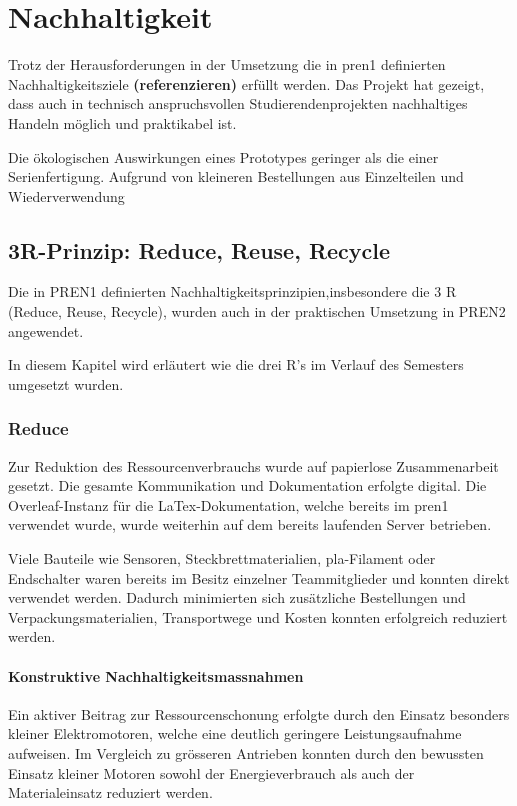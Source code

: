 \section{Nachhaltigkeit}

Trotz der Herausforderungen in der Umsetzung die in \acrshort{pren1}  definierten Nachhaltigkeitsziele \textbf{(referenzieren)} erfüllt werden. Das Projekt hat gezeigt, dass auch in technisch anspruchsvollen Studierendenprojekten nachhaltiges Handeln möglich und praktikabel ist.

Die ökologischen Auswirkungen eines Prototypes geringer als die einer Serienfertigung. Aufgrund von kleineren Bestellungen aus Einzelteilen und Wiederverwendung

\subsection{3R-Prinzip: Reduce, Reuse, Recycle}
Die in PREN1 definierten Nachhaltigkeitsprinzipien,insbesondere die 3 R (Reduce, Reuse, Recycle), wurden auch in der praktischen Umsetzung in PREN2 angewendet.  

 In diesem Kapitel wird erläutert wie die drei R's im Verlauf des Semesters umgesetzt wurden.

\subsubsection{Reduce}


Zur Reduktion des Ressourcenverbrauchs wurde auf papierlose Zusammenarbeit gesetzt. Die gesamte Kommunikation und Dokumentation erfolgte digital. Die Overleaf-Instanz für die LaTex-Dokumentation, welche bereits im \acrshort{pren1} verwendet wurde, wurde weiterhin auf dem bereits laufenden Server betrieben.

Viele Bauteile wie Sensoren, Steckbrettmaterialien, \acrshort{pla}-Filament oder Endschalter waren bereits im Besitz einzelner Teammitglieder und konnten direkt verwendet werden. Dadurch minimierten sich zusätzliche Bestellungen und Verpackungsmaterialien, Transportwege und Kosten konnten erfolgreich reduziert werden.

\paragraph{Konstruktive Nachhaltigkeitsmassnahmen}
Ein aktiver Beitrag zur Ressourcenschonung erfolgte durch den Einsatz besonders kleiner Elektromotoren, welche eine deutlich geringere Leistungsaufnahme aufweisen. Im Vergleich zu grösseren Antrieben konnten durch den bewussten Einsatz kleiner Motoren sowohl der Energieverbrauch als auch der Materialeinsatz reduziert werden. 

